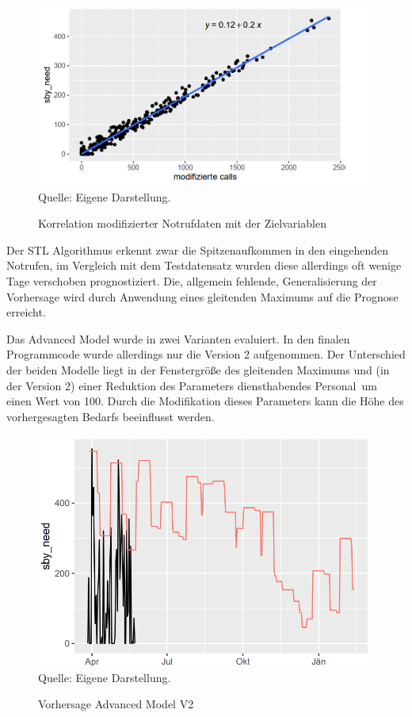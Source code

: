 \begin{figure}[h]
\centering
\caption{Korrelation modifizierter Notrufdaten mit der Zielvariablen}
\includegraphics[width=15cm]{01_resources/reg_call_correlation_year.png}\\
Quelle: Eigene Darstellung.
\label{fig:regcall-corr-year}
\end{figure}
\FloatBarrier

Der STL Algorithmus erkennt zwar die Spitzenaufkommen in den eingehenden Notrufen, im Vergleich mit dem Testdatensatz wurden diese allerdings oft wenige Tage verschoben prognostiziert. Die, allgemein fehlende, Generalisierung der Vorhersage wird durch Anwendung eines gleitenden Maximums  auf die Prognose erreicht. 

Das Advanced Model wurde in zwei Varianten evaluiert. In den finalen Programmcode wurde allerdings nur die Version 2 aufgenommen. Der Unterschied der beiden Modelle liegt in der Fenstergröße des gleitenden Maximums und (in der Version 2) einer Reduktion des Parameters \glqq diensthabendes Personal\grqq\ um einen Wert von 100. Durch die Modifikation dieses Parameters kann die Höhe des vorhergesagten Bedarfs beeinflusst werden.

\begin{figure}[h]
\centering
\caption{Vorhersage Advanced Model V2}
\includegraphics[width=15cm]{01_resources/adv2.png}\\
Quelle: Eigene Darstellung.
\label{fig:adv2}
\end{figure}
\FloatBarrier

